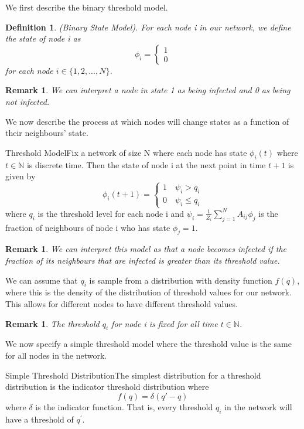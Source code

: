 \documentclass[twoside]{article}
\newtheorem{definition}[theorem]{Definition}
\newtheorem{remark}[theorem]{Remark}
\begin{document}
We first describe the binary threshold model.
\begin{definition}(Binary State Model). For each node i in our network, we define the state of node i as 
$$
\phi_i = 
\begin{cases}
1 \\
0
\end{cases}
$$
for each node $i \in \{1,2,...,N\}$.
\end{definition}

\begin{remark}We can interpret a node in state 1 as being infected and 0 as being not infected.
\end{remark}

We now describe the process at which nodes will change states as a function of their neighbours' state.

\begin{definition_exam}{Threshold Model}{}Fix a network of size N where each node has state $\phi_i(t)$ where $t \in \mathbb{N}$ is discrete time. Then the state of node i at the next point in time $t + 1$ is given by 
$$
\phi_i(t + 1) = 
\begin{cases}
1 \quad \psi_i > q_i\\
0 \quad \psi_i \leq q_i
\end{cases}
$$
where $q_i$ is the threshold level for each node i and $\psi_i = \frac{1}{Z_i}\sum_{j = 1}^{N}A_{ij}\phi_j$ is the fraction of neighbours of node i who has state $\phi_j = 1$.
\end{definition_exam}

\begin{remark}We can interpret this model as that a node becomes infected if the fraction of its neighbours that are infected is greater than its threshold value.
\end{remark}

We can assume that $q_i$ is sample from a distribution with density function $f(q)$, where this is the density of the distribution of threshold values for our network. This allows for different nodes to have different threshold values.

\begin{remark}The threshold $q_i$ for node i is fixed for all time $t \in \mathbb{N}$.
\end{remark}

We now specify a simple threshold model where the threshold value is the same for all nodes in the network.
\begin{definition_exam}{Simple Threshold Distribution}{}The simplest distribution for a threshold distribution is the indicator threshold distribution where 
$$
f(q) = \delta (q' - q)
$$
where $\delta$ is the indicator function. That is, every threshold $q_i$ in the network will have a threshold of $q^{'}$.
\end{definition_exam}
\end{document}
